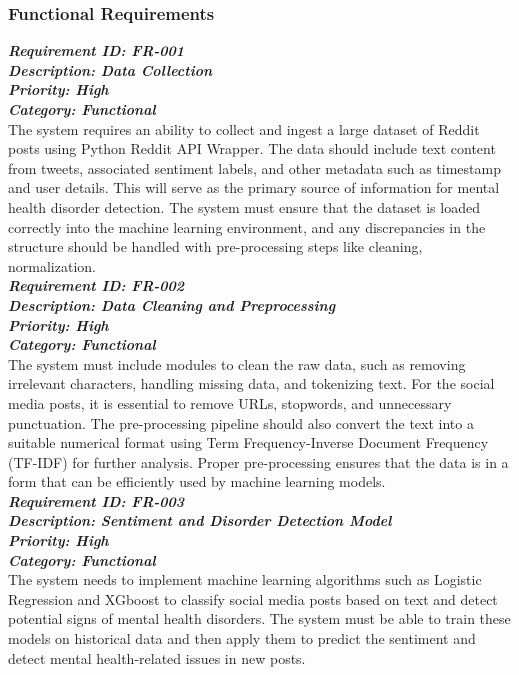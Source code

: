 
\subsubsection{Functional Requirements}

\noindent
\textbf{\emph{Requirement ID: FR-001}} \\ 
\textbf{\emph{Description: Data Collection}} \\
\textbf{\emph{Priority: High}} \\
\textbf{\emph{Category: Functional}} \\
\noindent
The system requires an ability to collect and ingest a large dataset of Reddit posts using Python Reddit API Wrapper. The data should include text content from tweets, associated sentiment labels, and other metadata such as timestamp and user details. This will serve as the primary source of information for mental health disorder detection. The system must ensure that the dataset is loaded correctly into the machine learning environment, and any discrepancies in the structure should be handled with pre-processing steps like cleaning, normalization. \\

\noindent
\textbf{\emph{Requirement ID: FR-002}} \\ 
\textbf{\emph{Description: Data Cleaning and Preprocessing}} \\
\textbf{\emph{Priority: High}} \\
\textbf{\emph{Category: Functional}} \\
\noindent
The system must include modules to clean the raw data, such as removing irrelevant characters, handling missing data, and tokenizing text. For the social media posts, it is essential to remove URLs, stopwords, and unnecessary punctuation. The pre-processing pipeline should also convert the text into a suitable numerical format using Term Frequency-Inverse Document Frequency (TF-IDF) for further analysis. Proper pre-processing ensures that the data is in a form that can be efficiently used by machine learning models. \\

\noindent
\textbf{\emph{Requirement ID: FR-003}} \\ 
\textbf{\emph{Description: Sentiment and Disorder Detection Model}} \\
\textbf{\emph{Priority: High}} \\
\textbf{\emph{Category: Functional}} \\
\noindent
The system needs to implement machine learning algorithms such as Logistic Regression and XGboost to classify social media posts based on text and detect potential signs of mental health disorders. The system must be able to train these models on historical data and then apply them to predict the sentiment and detect mental health-related issues in new posts. \\

